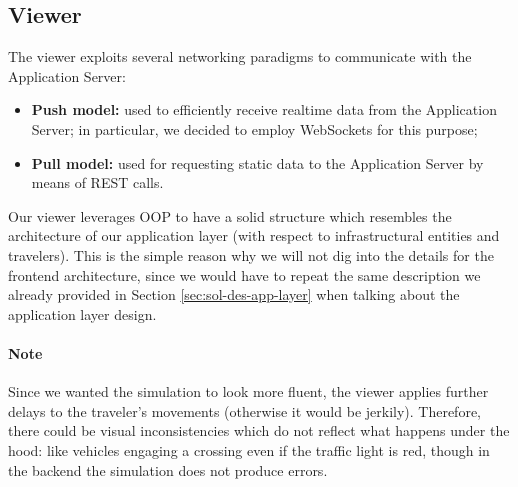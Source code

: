 \subsection{Viewer}

The viewer exploits several networking paradigms to communicate with the
Application Server:

\begin{itemize}
  \item \textbf{Push model:} used to efficiently receive realtime data from
    the Application Server; in particular, we decided to employ WebSockets
    for this purpose;
  \item \textbf{Pull model:} used for requesting static data to the
    Application Server by means of REST calls.
\end{itemize}

Our viewer leverages OOP to have a solid structure which resembles the
architecture of our application layer (with respect to infrastructural
entities and travelers). This is the simple reason why we will not dig into
the details for the frontend architecture, since we would have to repeat the
same description we already provided in Section \ref{sec:sol-des-app-layer}
when talking about the application layer design.

\paragraph{Note}
Since we wanted the simulation to look more fluent, the viewer applies further delays to the traveler's movements (otherwise it would be jerkily).
Therefore, there could be visual inconsistencies which do not reflect what happens under the hood: like vehicles engaging a crossing even if the traffic light is red, though in the backend the simulation does not produce errors.